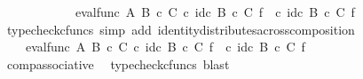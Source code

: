 \begin{isabellebody}
\ \ \ \ \ \ \ \ \ \ \ \ eval{\isacharunderscore}{\kern0pt}func\ A\ {\isacharparenleft}{\kern0pt}B\ {\isasymtimes}\isactrlsub c\ C{\isacharparenright}{\kern0pt}\ {\isasymcirc}\isactrlsub c\ {\isacharparenleft}{\kern0pt}{\isacharparenleft}{\kern0pt}id\isactrlsub c\ {\isacharparenleft}{\kern0pt}B\ {\isasymtimes}\isactrlsub c\ C{\isacharparenright}{\kern0pt}\ {\isasymtimes}\isactrlsub f\ {\isacharparenleft}{\kern0pt}{\isasympsi}\isactrlsup {\isasymsharp}{\isacharparenright}{\kern0pt}{\isacharparenright}{\kern0pt}\ {\isasymcirc}\isactrlsub c\ {\isacharparenleft}{\kern0pt}id\isactrlsub c\ {\isacharparenleft}{\kern0pt}B\ {\isasymtimes}\isactrlsub c\ C{\isacharparenright}{\kern0pt}\ {\isasymtimes}\isactrlsub f\ {\isasymphi}\isactrlsup {\isasymsharp}\isactrlsup {\isasymsharp}{\isacharparenright}{\kern0pt}{\isacharparenright}{\kern0pt}{\isachardoublequoteclose}\isanewline
\ \ \ \ \ \ \ \ \isamarkupfalse%
\ {\isacharparenleft}{\kern0pt}typecheck{\isacharunderscore}{\kern0pt}cfuncs{\isacharcomma}{\kern0pt}\ simp\ add{\isacharcolon}{\kern0pt}\ identity{\isacharunderscore}{\kern0pt}distributes{\isacharunderscore}{\kern0pt}across{\isacharunderscore}{\kern0pt}composition{\isacharparenright}{\kern0pt}\isanewline
\ \ \ \ \ \ \isamarkupfalse%
\ \isamarkupfalse%
\ {\isachardoublequoteopen}{\isachardot}{\kern0pt}{\isachardot}{\kern0pt}{\isachardot}{\kern0pt}\ {\isacharequal}{\kern0pt}\ {\isacharparenleft}{\kern0pt}\ eval{\isacharunderscore}{\kern0pt}func\ A\ {\isacharparenleft}{\kern0pt}B\ {\isasymtimes}\isactrlsub c\ C{\isacharparenright}{\kern0pt}\ {\isasymcirc}\isactrlsub c\ {\isacharparenleft}{\kern0pt}id\isactrlsub c\ {\isacharparenleft}{\kern0pt}B\ {\isasymtimes}\isactrlsub c\ C{\isacharparenright}{\kern0pt}\ {\isasymtimes}\isactrlsub f\ {\isacharparenleft}{\kern0pt}{\isasympsi}\isactrlsup {\isasymsharp}{\isacharparenright}{\kern0pt}{\isacharparenright}{\kern0pt}{\isacharparenright}{\kern0pt}\ {\isasymcirc}\isactrlsub c\ {\isacharparenleft}{\kern0pt}id\isactrlsub c\ {\isacharparenleft}{\kern0pt}B\ {\isasymtimes}\isactrlsub c\ C{\isacharparenright}{\kern0pt}\ {\isasymtimes}\isactrlsub f\ {\isasymphi}\isactrlsup {\isasymsharp}\isactrlsup {\isasymsharp}{\isacharparenright}{\kern0pt}{\isachardoublequoteclose}\isanewline
\ \ \ \ \ \ \ \ \isamarkupfalse%
\ comp{\isacharunderscore}{\kern0pt}associative{}\ \isamarkupfalse%
\ {\isacharparenleft}{\kern0pt}typecheck{\isacharunderscore}{\kern0pt}cfuncs{\isacharcomma}{\kern0pt}\ blast{\isacharparenright}{\kern0pt}\isanewline
\ \ \ \ \ \ \isamarkupfalse%

\end{isabellebody}
